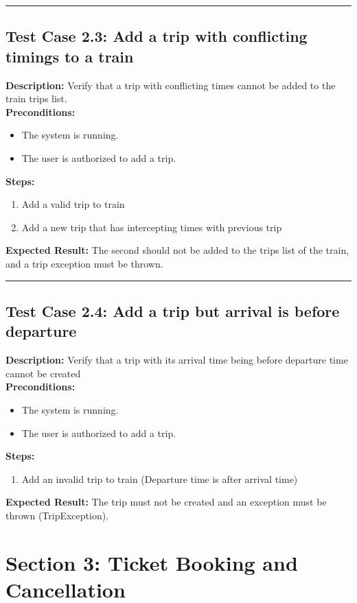 \documentclass{article}
\begin{document}
\bigskip
\hrule
\bigskip

\subsection{Test Case 2.3: Add a trip with conflicting timings to a train}

\textbf{Description:} Verify that a trip with conflicting times cannot be added to the train trips list.\\
\textbf{Preconditions:}
\begin{itemize}
  \item The system is running.
  \item The user is authorized to add a trip.
\end{itemize}
\textbf{Steps:}
\begin{enumerate}
  \item Add a valid trip to train
  \item Add a new trip that has intercepting times with previous trip
\end{enumerate}
\textbf{Expected Result:} The second should not be added to the trips list of the train, and a trip exception must be thrown.

\bigskip
\hrule
\bigskip

\subsection{Test Case 2.4: Add a trip but arrival is before departure}

\textbf{Description:} Verify that a trip with its arrival time being before departure time cannot be created\\
\textbf{Preconditions:}
\begin{itemize}
  \item The system is running.
  \item The user is authorized to add a trip.
\end{itemize}
\textbf{Steps:}
\begin{enumerate}
  \item Add an invalid trip to train (Departure time is after arrival time)
\end{enumerate}
\textbf{Expected Result:} The trip must not be created and an exception must be thrown (TripException).

\pagebreak

\section{Section 3: Ticket Booking and Cancellation}
\bigskip
\bigskip
\end{document}
